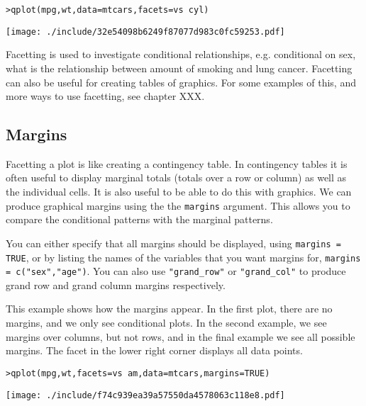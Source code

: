 \begin{alltt}
> qplot(mpg, wt, data = mtcars, facets = vs ~ cyl)
\end{alltt}
\texttt{[image: ./include/32e54098b6249f87077d983c0fc59253.pdf]}
\begin{alltt}

\end{alltt}

Facetting is used to investigate conditional relationships, e.g. conditional on sex, what is the relationship between amount of smoking and lung cancer.  Facetting can also be useful for creating tables of graphics.  For some examples of this, and more ways to use facetting, see chapter XXX.

\subsection{Margins}\label{sub:margins}

Facetting a plot is like creating a contingency table.  In contingency tables it is often useful to display marginal totals (totals over a row or column) as well as the individual cells.  It is also useful to be able to do this with graphics.  We can produce graphical margins using the the {\tt margins} argument.  This allows you to compare the conditional patterns with the marginal patterns.

You can either specify that all margins should be displayed, using {\tt margins = TRUE}, or by listing the names of the variables that you want margins for, {\tt margins = c("sex","age")}.  You can also use \verb|"grand_row"| or \verb|"grand_col"| to produce grand row and grand column margins respectively.

This example shows how the margins appear.  In the first plot, there are no margins, and we only see conditional plots.  In the second example, we see margins over columns, but not rows, and in the final example we see all possible margins.  The facet in the lower right corner displays all data points.

\begin{alltt}
> qplot(mpg, wt, facets = vs ~ am, data = mtcars, margins = TRUE)
\end{alltt}
\texttt{[image: ./include/f74c939ea39a57550da4578063c118e8.pdf]}
\begin{alltt}

\end{alltt}

